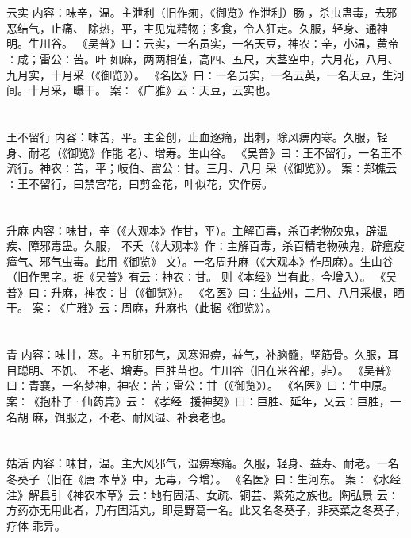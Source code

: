 \documentclass[12pt,UTF8]{ctexbook}
\begin{document}
\section{}云实
内容：味辛，温。主泄利（旧作痢，《御览》作泄利）肠 ，杀虫蛊毒，去邪恶结气，止痛、 
除热，平，主见鬼精物；多食，令人狂走。久服，轻身、通神明。生川谷。 
《吴普》曰∶云实，一名员实，一名天豆，神农∶辛，小温，黄帝∶咸；雷公∶苦。叶 
如麻，两两相值，高四、五尺，大茎空中，六月花，八月、九月实，十月采（《御览》）。 
《名医》曰∶一名员实，一名云英，一名天豆，生河间。十月采，曝干。 
案∶《广雅》云∶天豆，云实也。 


\section{}王不留行
内容：味苦，平。主金创，止血逐痛，出刺，除风痹内寒。久服，轻身、耐老（《御览》作能 
老）、增寿。生山谷。 
《吴普》曰∶王不留行，一名王不流行。神农∶苦，平；岐伯、雷公∶甘。三月、八月 
采（《御览》）。 
案∶郑樵云∶王不留行，曰禁宫花，曰剪金花，叶似花，实作房。 


\section{}升麻
内容：味甘，辛（《大观本》作甘，平）。主解百毒，杀百老物殃鬼，辟温疾、障邪毒蛊。久服， 
不夭（《大观本》作∶主解百毒，杀百精老物殃鬼，辟瘟疫瘴气、邪气虫毒。此用《御览》 
文）。一名周升麻（《大观本》作周麻）。生山谷（旧作黑字。据《吴普》有云∶神农∶甘。 
则《本经》当有此，今增入）。 
《吴普》曰∶升麻，神农∶甘（《御览》）。 
《名医》曰∶生益州，二月、八月采根，晒干。 
案∶《广雅》云∶周麻，升麻也（此据《御览》）。 


\section{}青
内容：味甘，寒。主五脏邪气，风寒湿痹，益气，补脑髓，坚筋骨。久服，耳目聪明、不饥、 
不老、增寿。巨胜苗也。生川谷（旧在米谷部，非）。 
《吴普》曰∶青襄，一名梦神，神农∶苦；雷公∶甘（《御览》）。 
《名医》曰∶生中原。 
案∶《抱朴子·仙药篇》云∶《孝经·援神契》曰∶巨胜、延年，又云∶巨胜，一名胡 
麻，饵服之，不老、耐风湿、补衰老也。 


\section{}姑活
内容：味甘，温。主大风邪气，湿痹寒痛。久服，轻身、益寿、耐老。一名冬葵子（旧在《唐 
本草》中，无毒，今增）。 
《名医》曰∶生河东。 
案∶《水经注》解县引《神农本草》云∶地有固活、女疏、铜芸、紫苑之族也。陶弘景 
云∶方药亦无用此者，乃有固活丸，即是野葛一名。此又名冬葵子，非葵菜之冬葵子，疗体 
乖异。 
\end{document}
